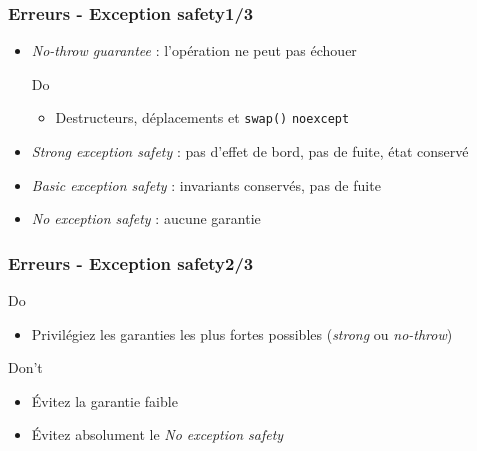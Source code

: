 \documentclass[C++.tex]{subfiles}
\begin{document}
\begin{frame}
	\frametitle{Erreurs - Exception safety\titlehfill{}1/3}
	\begin{itemize}
		\item \textit{No-throw guarantee} : l'opération ne peut pas échouer


		\begin{exampleblock}{Do}
			\begin{itemize}
				\item Destructeurs, déplacements et \lstinline|swap()| \lstinline|noexcept|

			\end{itemize}
		\end{exampleblock}

		\item \textit{Strong exception safety} : pas d'effet de bord, pas de fuite, état conservé


		\item \textit{Basic exception safety} : invariants conservés, pas de fuite


\item \textit{No exception safety} : aucune garantie
	\end{itemize}
\end{frame}

\begin{frame}
	\frametitle{Erreurs - Exception safety\titlehfill{}2/3}
	\begin{exampleblock}{Do}
		\begin{itemize}
			\item Privilégiez les garanties les plus fortes possibles (\textit{strong} ou \textit{no-throw})
		\end{itemize}
	\end{exampleblock}

	\begin{alertblock}{Don't}
		\begin{itemize}
			\item Évitez la garantie faible
			\item Évitez absolument le \textit{No exception safety}
		\end{itemize}
	\end{alertblock}
\end{frame}
\end{document}
